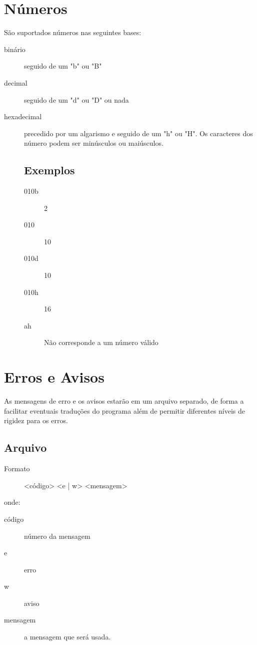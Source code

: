 \documentclass[a4paper,10pt]{article}
\begin{document}
\section{Números}
São suportados números nas seguintes bases:
\begin{description}
	\item [binário] seguido de um "b" ou "B" 
	\item [decimal] seguido de um "d" ou "D" ou nada 
	\item [hexadecimal] precedido por um algarismo e seguido de um "h" ou "H". Os caracteres dos número podem ser minúsculos ou maiúsculos.
	
	\subsection{Exemplos}
	\begin{description}
	 \item [010b] 2
	 \item [010] 10
	 \item [010d] 10
	 \item [010h] 16
	 \item [ah] Não corresponde a um número válido
	\end{description}

\end{description}


			
\section{Erros e Avisos}

As mensagens de erro e os avisos estarão em um arquivo separado, de forma a facilitar eventuais traduções do programa além de permitir diferentes níveis de rigidez para os erros.

	\subsection{Arquivo}
		\begin{description}
			\item [Formato] <código> <e | w> <mensagem>
		\end{description}
		onde:
		\begin{description}
			\item [código] número da mensagem
			\item [e] erro
			\item [w] aviso
			\item [mensagem] a mensagem que será usada.
		\end{description}
		
\end{document}
